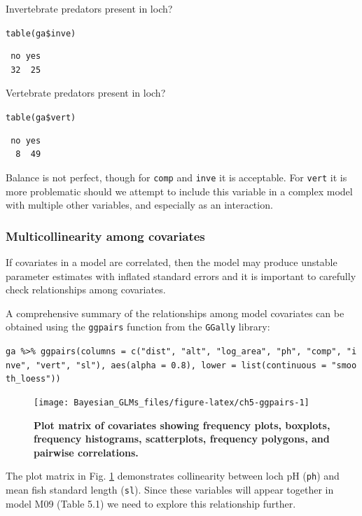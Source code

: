 \documentclass[
]{book}
\begin{document}
Invertebrate predators present in loch?

\texttt{table(ga\$inve)}

\begin{verbatim}
 no yes 
 32  25 
\end{verbatim}

Vertebrate predators present in loch?

\texttt{table(ga\$vert)}

\begin{verbatim}
 no yes 
  8  49 
\end{verbatim}

Balance is not perfect, though for \texttt{comp} and \texttt{inve} it is acceptable. For \texttt{vert} it is more problematic should we attempt to include this variable in a complex model with multiple other variables, and especially as an interaction.

\hypertarget{pois-collin}{%
\subsubsection{Multicollinearity among covariates}\label{pois-collin}}

If covariates in a model are correlated, then the model may produce unstable parameter estimates with inflated standard errors and it is important to carefully check relationships among covariates.

A comprehensive summary of the relationships among model covariates can be obtained using the \texttt{ggpairs} function from the \texttt{GGally} library:



\texttt{ga\ \%\textgreater{}\%\ ggpairs(columns\ =\ c("dist",\ "alt",\ "log\_area",\ "ph",\ "comp",\ "inve",\ "vert",\ "sl"),\ aes(alpha\ =\ 0.8),\ lower\ =\ list(continuous\ =\ "smooth\_loess"))}

\begin{figure}

{\centering \texttt{[image: Bayesian\_GLMs\_files/figure-latex/ch5-ggpairs-1]} 

}

\caption{\textbf{Plot matrix of covariates showing frequency plots, boxplots, frequency histograms, scatterplots, frequency polygons, and pairwise correlations.}}\label{fig:ch5-ggpairs}
\end{figure}

The plot matrix in Fig. \ref{fig:ch5-ggpairs} demonstrates collinearity between loch pH (\texttt{ph}) and mean fish standard length (\texttt{sl}). Since these variables will appear together in model M09 (Table 5.1) we need to explore this relationship further.
\end{document}
